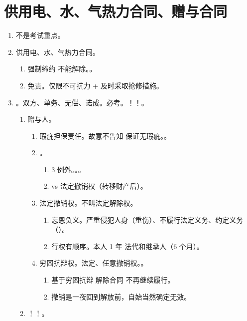 \section{供用电、水、气热力合同、赠与合同}
\begin{enumerate}
  \item 不是考试重点。
  \item 供用电、水、气热力合同。
        \begin{enumerate}
          \item 强制缔约 \yjt 不能解除。。
          \item 免责。仅限不可抗力 + 及时采取抢修措施。
        \end{enumerate}
  \item {}。双方、单务、无偿、诺成。必考。！！。
        \begin{enumerate}
          \item 赠与人。
                \begin{enumerate}
                  \item 瑕疵担保责任。故意不告知 \hz 保证无瑕疵。。
                  \item {}。
                        \begin{enumerate}
                          \item 3 例外。。。
                          \item vs 法定撤销权（转移财产后）。
                        \end{enumerate}
                  \item 法定撤销权。不叫法定解除权。
                        \begin{enumerate}
                          \item 忘恩负义。严重侵犯人身（重伤）、不履行法定义务、约定义务（）。
                          \item 行权有顺序。本人 1 年 \yjt 法代和继承人（6 个月）。
                        \end{enumerate}
                  \item 穷困抗辩权。\bdy 法定、任意撤销权。。
                        \begin{enumerate}
                          \item 基于穷困抗辩 \yjt 解除合同 \yjt 不再继续履行。
                          \item 撤销是一夜回到解放前，自始当然确定无效。
                        \end{enumerate}
                \end{enumerate}
          \item {}！！。
        \end{enumerate}
\end{enumerate}
